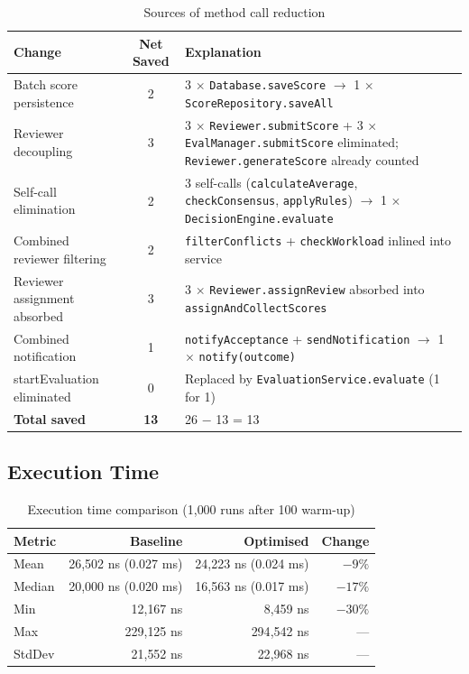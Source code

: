 \documentclass[12pt, a4paper]{article}
\begin{document}
\begin{table}[H]
\centering
\caption{Sources of method call reduction}
\label{tab:call-reductions}
\begin{tabularx}{\textwidth}{X c X}
    \toprule
    \textbf{Change} & \textbf{Net Saved} & \textbf{Explanation} \\
    \midrule
    Batch score persistence & 2 & 3 $\times$ \texttt{Database.saveScore} $\rightarrow$ 1 $\times$ \texttt{ScoreRepository.saveAll} \\
    Reviewer decoupling & 3 & 3 $\times$ \texttt{Reviewer.submitScore} + 3 $\times$ \texttt{EvalManager.submitScore} eliminated; \texttt{Reviewer.generateScore} already counted \\
    Self-call elimination & 2 & 3 self-calls (\texttt{calculateAverage}, \texttt{checkConsensus}, \texttt{applyRules}) $\rightarrow$ 1 $\times$ \texttt{DecisionEngine.evaluate} \\
    Combined reviewer filtering & 2 & \texttt{filterConflicts} + \texttt{checkWorkload} inlined into service \\
    Reviewer assignment absorbed & 3 & 3 $\times$ \texttt{Reviewer.assignReview} absorbed into \texttt{assignAndCollectScores} \\
    Combined notification & 1 & \texttt{notifyAcceptance} + \texttt{sendNotification} $\rightarrow$ 1 $\times$ \texttt{notify(outcome)} \\
    startEvaluation eliminated & 0 & Replaced by \texttt{EvaluationService.evaluate} (1 for 1) \\
    \midrule
    \textbf{Total saved} & \textbf{13} & 26 $-$ 13 = 13 \\
    \bottomrule
\end{tabularx}
\end{table}

\subsection{Execution Time}

\begin{table}[H]
\centering
\caption{Execution time comparison (1{,}000 runs after 100 warm-up)}
\label{tab:timing}
\begin{tabular}{l r r r}
    \toprule
    \textbf{Metric} & \textbf{Baseline} & \textbf{Optimised} & \textbf{Change} \\
    \midrule
    Mean    & 26{,}502 ns (0.027 ms) & 24{,}223 ns (0.024 ms) & $-9\%$ \\
    Median  & 20{,}000 ns (0.020 ms) & 16{,}563 ns (0.017 ms) & $-17\%$ \\
    Min     & 12{,}167 ns            & 8{,}459 ns             & $-30\%$ \\
    Max     & 229{,}125 ns           & 294{,}542 ns           & --- \\
    StdDev  & 21{,}552 ns            & 22{,}968 ns            & --- \\
    \bottomrule
\end{tabular}
\end{table}
\end{document}
